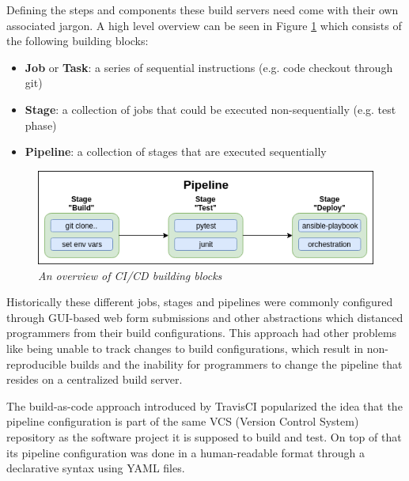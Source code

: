 Defining the steps and components these build servers need come with their own associated jargon.\cite{oss-tdd} A high level overview can be seen in Figure \ref{fig:pipeline-overview} which consists of the following building blocks:
\begin{itemize}
    \item \textbf{Job} or \textbf{Task}: a series of sequential instructions (e.g. code checkout through git)
    \item \textbf{Stage}: a collection of jobs that could be executed non-sequentially (e.g. test phase)
    \item \textbf{Pipeline}: a collection of stages that are executed sequentially
\end{itemize}

\begin{figure}[ht]
    \centering
    \includegraphics[width=\textwidth]{figures/drawio/pipeline_overview.png}
    \caption{\textit{An overview of CI/CD building blocks}}
    \label{fig:pipeline-overview}
\end{figure}

\pagebreak

Historically these different jobs, stages and pipelines were commonly configured through GUI-based web form submissions and other abstractions which distanced programmers from their build configurations.\cite{intro-pipeline-as-code,jenkins-pipeline} This approach had other problems like being unable to track changes to build configurations, which result in non-reproducible builds and the inability for programmers to change the pipeline that resides on a centralized build server.\cite{what-pipeline-as-code}


The build-as-code approach introduced by TravisCI popularized the idea that the pipeline configuration is part of the same VCS (Version Control System) repository as the software project it is supposed to build and test. On top of that its pipeline configuration was done in a human-readable format through a declarative syntax using YAML files.\cite{what-pipeline-as-code}

